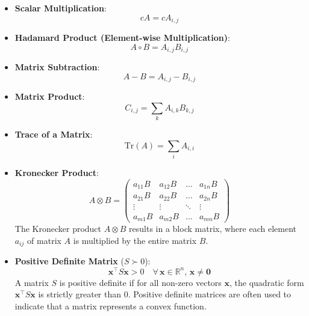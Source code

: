 \begin{itemize}
    \item \textbf{Scalar Multiplication}:
          \begin{equation}
              cA = c A_{i,j}
          \end{equation}

    \item \textbf{Hadamard Product (Element-wise Multiplication)}:
          \begin{equation}
              A \circ B = A_{i,j} B_{i,j}
          \end{equation}

    \item \textbf{Matrix Subtraction}:
          \begin{equation}
              A - B = A_{i,j} - B_{i,j}
          \end{equation}

    \item \textbf{Matrix Product}:
          \begin{equation}
              C_{i,j} = \sum_{k} A_{i,k} B_{k,j}
          \end{equation}

    \item \textbf{Trace of a Matrix}:
          \begin{equation}
              \text{Tr}(A) = \sum_{i} A_{i,i}
          \end{equation}

    \item \textbf{Kronecker Product}:
          \begin{equation}
              A \otimes B =
              \begin{pmatrix}
                  a_{11} B & a_{12} B & \dots  & a_{1n} B \\
                  a_{21} B & a_{22} B & \dots  & a_{2n} B \\
                  \vdots   & \vdots   & \ddots & \vdots   \\
                  a_{m1} B & a_{m2} B & \dots  & a_{mn} B
              \end{pmatrix}
          \end{equation}
          The Kronecker product $A \otimes B$ results in a block matrix, where each element $a_{ij}$ of matrix $A$ is multiplied by the entire matrix $B$.

    \item \textbf{Positive Definite Matrix} ($S \succ 0$):
          \begin{equation}
              \mathbf{x}^\top S \mathbf{x} > 0 \quad \forall \, \mathbf{x} \in \mathbb{R}^n, \, \mathbf{x} \neq \mathbf{0}
          \end{equation}
          A matrix $S$ is positive definite if for all non-zero vectors $\mathbf{x}$, the quadratic form $\mathbf{x}^\top S \mathbf{x}$ is strictly greater than 0. Positive definite matrices are often used to indicate that a matrix represents a convex function.
\end{itemize}


